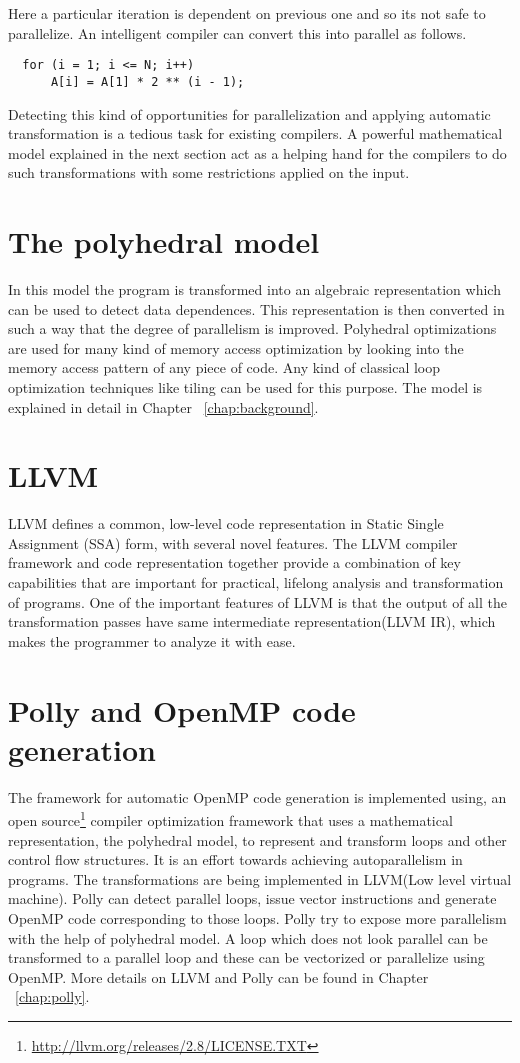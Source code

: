 \noindent
Here a particular iteration is dependent on previous one and so its not safe to parallelize.
An intelligent compiler can convert this into parallel as follows.

{\footnotesize
\begin{lstlisting}
  for (i = 1; i <= N; i++)
      A[i] = A[1] * 2 ** (i - 1);
\end{lstlisting}
}

Detecting this kind of opportunities for parallelization and applying automatic transformation
is a tedious task for existing compilers. A powerful mathematical model explained in the next
section act as a helping hand for the compilers to do such transformations with some
restrictions applied on the input.

\section{The polyhedral model}

In this model the program is transformed into an algebraic representation which can be used to
detect data dependences. This representation is then converted in such a way that the degree
of parallelism is improved. Polyhedral optimizations are used for many kind of memory access optimization by
looking into the memory access pattern of any piece of code. Any kind of classical
 loop optimization techniques like tiling can be used for this purpose. The model is
explained in detail in Chapter ~\ref{chap:background}.

\section{LLVM}
LLVM defines a common, low-level code representation in Static Single Assignment
(SSA) form, with several novel features. The LLVM compiler framework and code
representation together provide a combination of key capabilities that are
important for practical, lifelong analysis and transformation of programs.
One of the important features of LLVM is that the output of all the
transformation passes have same intermediate representation(LLVM IR), which
makes the programmer to analyze it with ease.

\section{Polly and OpenMP code generation}
The framework for automatic OpenMP code generation is implemented using,
an open source\footnote{\url{http://llvm.org/releases/2.8/LICENSE.TXT}} compiler  optimization framework that uses a mathematical
 representation, the polyhedral model, to represent and transform loops and other
 control flow structures. It is an effort towards achieving autoparallelism in programs.
 The transformations are being implemented in LLVM(Low level virtual machine). 
Polly can detect parallel loops, issue vector instructions and generate OpenMP code 
corresponding to those loops. Polly try to expose more parallelism
with the help of polyhedral model. A loop which does not look parallel can be transformed
to a parallel loop and these can be vectorized or parallelize using OpenMP. More details on
LLVM and Polly can be found in Chapter  ~\ref{chap:polly}.

